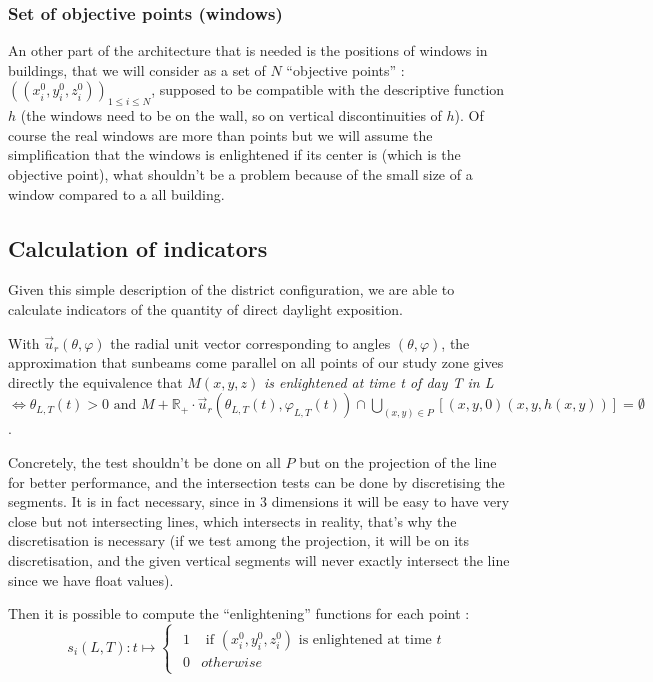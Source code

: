 \documentclass[english]{article}
\begin{document}
\subsubsection*{Set of objective points (windows)}

An other part of the architecture that is needed is the positions
of windows in buildings, that we will consider as a set of $N$ ``objective
points'' : $((x_{i}^{0},y_{i}^{0},z_{i}^{0}))_{1\leq i\leq N}$,
supposed to be compatible with the descriptive function $h$ (the
windows need to be on the wall, so on vertical discontinuities of
$h$). Of course the real windows are more than points but we will
assume the simplification that the windows is enlightened if its center
is (which is the objective point), what shouldn't be a problem because
of the small size of a window compared to a all building.


\subsection*{Calculation of indicators}

Given this simple description of the district configuration, we are
able to calculate indicators of the quantity of direct daylight exposition.

With $\vec{u}_{r}(\theta,\varphi)$ the radial unit vector corresponding
to angles $(\theta,\varphi)$, the approximation that sunbeams come
parallel on all points of our study zone gives directly the equivalence
that $M(x,y,z)$ \textit{is enlightened at time t of day T in L }$\iff\theta_{L,T}(t)>0\textrm{ and }M+\mathbb{R}_{+}\cdot\vec{u}_{r}(\theta_{L,T}(t),\varphi_{L,T}(t))\cap\bigcup_{(x,y)\in P}[(x,y,0)(x,y,h(x,y))]=\emptyset$.

Concretely, the test shouldn't be done on all $P$ but on the projection
of the line for better performance, and the intersection tests can
be done by discretising the segments. It is in fact necessary, since
in 3 dimensions it will be easy to have very close but not intersecting
lines, which intersects in reality, that's why the discretisation
is necessary (if we test among the projection, it will be on its discretisation,
and the given vertical segments will never exactly intersect the line
since we have float values).

Then it is possible to compute the ``enlightening'' functions for
each point :
\[
s_{i}(L,T):t\mapsto\begin{cases}
\begin{array}{cc}
1 & \textrm{ if }(x_{i}^{0},y_{i}^{0},z_{i}^{0})\textrm{ is enlightened at time }t\\
0 & otherwise
\end{array}\end{cases}
\]
\end{document}
